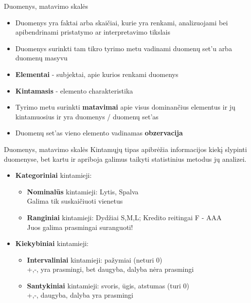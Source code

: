 \documentclass[11pt,xcolor=table]{beamer}
\begin{document}
\begin{frame}{Duomenys, matavimo skalės}
\begin{itemize}
\item Duomenys yra faktai arba skaičiai, kurie yra renkami, analizuojami bei apibendrinami pristatymo ar interpretavimo tikslais
\item Duomenys surinkti tam tikro tyrimo metu vadinami duomenų set'u arba duomenų masyvu
\item \textbf{Elementai} - subjektai, apie kurios renkami duomenys
\item \textbf{Kintamasis} - elemento charakteristika
\item Tyrimo metu surinkti \textbf{matavimai} apie visus dominančius elementus ir jų kintamuosius ir yra duomenys / duomenų set'as
\item Duomenų set'as vieno elemento vadinamas \textbf{obzervacija}
\end{itemize}
\end{frame}


\begin{frame}{Duomenys, matavimo skalės}
Kintamųjų tipas apibrėžia informacijos kiekį slypinti duomenyse, bet kartu ir apriboja galimus taikyti statistinius metodus jų analizei.
\begin{itemize}
\item \textbf{Kategoriniai} kintamieji:
\begin{itemize}
\item \textbf{Nominalūs} kintamieji: Lytis, Spalva
\\ Galima tik suskaičiuoti vienetus
\item \textbf{Ranginiai} kintamieji: Dydžiai S,M,L; Kredito reitingai F - AAA 
\\ Juos galima prasmingai suranguoti!
\end{itemize}
\item \textbf{Kiekybiniai} kintamieji:
\begin{itemize}
\item \textbf{Intervaliniai} kintamieji: pažymiai (neturi 0)
\\ +,-, yra prasmingi, bet daugyba, dalyba nėra prasmingi
\item \textbf{Santykiniai} kintamieji: svoris, ūgis, atstumas  (turi 0)
\\ +,-, daugyba, dalyba yra prasmingi
\end{itemize}
\end{itemize}
\end{frame}
\end{document}
